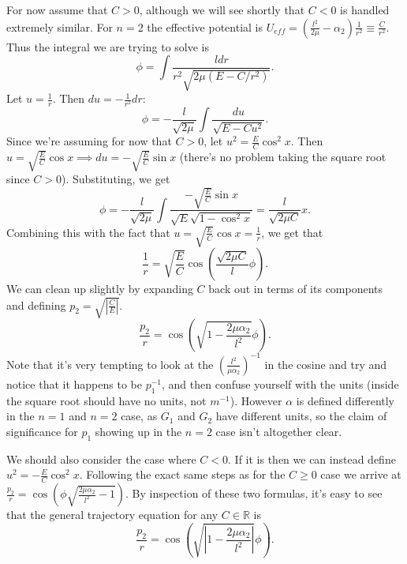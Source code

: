 \documentclass[letterpaper, reqno,11pt]{article}
\begin{document}
For now assume that $C>0$, although we will see shortly that $C<0$ is handled extremely similar. For $n=2$ the effective potential is $U_{eff}=\left( \frac{l^2}{2\mu}-\alpha_2 \right)\frac{1}{r^2}\equiv \frac{C}{r^2}$. Thus the integral we are trying to solve is 
\[
\phi=\int \frac{ldr}{r^2\sqrt{2\mu\left( E-C /r^2 \right) } }
.\]
Let $u=\frac{1}{r}$. Then $du=-\frac{1}{r^2} dr$: 
\[
\phi = -\frac{l}{\sqrt{2\mu} }\int \frac{du}{\sqrt{E-Cu^2} }
.\]
Since we're assuming for now that $C>0$, let $u^2=\frac{E}{C}\cos^2 x$. Then $u=\sqrt{\frac{E}{C}}\cos x\implies du=-\sqrt{\frac{E}{C}}\sin x$ (there's no problem taking the square root since $C>0$). Substituting, we get
\[
\phi=-\frac{l}{\sqrt{2\mu} }\int \frac{-\sqrt{\frac{E}{C}}\sin x }{\sqrt{E} \sqrt{1-\cos^2x} }=\frac{l}{\sqrt{2\mu C}}x
.\]
Combining this with the fact that $u=\sqrt{\frac{E}{C}}\cos x=\frac{1}{r}$, we get that
\[
\frac{1}{r}=\sqrt{\frac{E}{C}}\cos\left( \frac{\sqrt{2\mu C}}{l}\phi  \right)  
.\]
We can clean up slightly by expanding $C$ back out in terms of its components and defining $p_2=\sqrt{\left|\frac{C}{E}\right|} $. 
\[
\frac{p_2}{r}=\cos\left( \sqrt{1- \frac{2\mu\alpha_2}{l^2}} \phi \right) 
.\]
Note that it's very tempting to look at the $\left( \frac{l^2}{\mu\alpha_2} \right)^{-1} $ in the cosine and try and notice that it happens to be $p_1^{-1}$, and then confuse yourself with the units (inside the square root should have no units, not $m^{-1}$). However $\alpha$ is defined differently in the $n=1$ and $n=2$ case, as $G_1$ and $G_2$ have different units, so the claim of significance for $ p_1$ showing up in the $n=2$ case isn't altogether clear. %

We should also consider the case where $C<0$. If it is then we can instead define $u^2=-\frac{E}{C}\cos^2x$. Following the exact same steps as for the $C\geq0$ case we arrive at $\frac{p_2}{r}=\cos\left( \phi\sqrt{\frac{2\mu\alpha_2}{l^2}-1} \right) $. By inspection of these two formulas, it's easy to see that the general trajectory equation for any $C\in\mathbb{R}$ is 
 \[
\frac{p_2}{r}=\cos\left( \sqrt{\left|1- \frac{2\mu\alpha_2}{l^2}\right|} \phi \right) 
.\]
\end{document}
